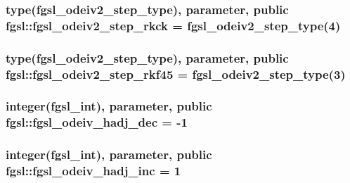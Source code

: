 \hypertarget{classfgsl_a18b4edbca94c0c9d60fbadc94d1d4964}{
\subsubsection[{fgsl\-\_\-odeiv2\-\_\-step\-\_\-rkck}]{\setlength{\rightskip}{0pt plus 5cm}type({\bf fgsl\-\_\-odeiv2\-\_\-step\-\_\-type}), parameter, public fgsl\-::fgsl\-\_\-odeiv2\-\_\-step\-\_\-rkck = {\bf fgsl\-\_\-odeiv2\-\_\-step\-\_\-type}(4)}}\label{classfgsl_a18b4edbca94c0c9d60fbadc94d1d4964}
\hypertarget{classfgsl_a9ddf77505b3bd58dea1832c7d57cb566}{
\subsubsection[{fgsl\-\_\-odeiv2\-\_\-step\-\_\-rkf45}]{\setlength{\rightskip}{0pt plus 5cm}type({\bf fgsl\-\_\-odeiv2\-\_\-step\-\_\-type}), parameter, public fgsl\-::fgsl\-\_\-odeiv2\-\_\-step\-\_\-rkf45 = {\bf fgsl\-\_\-odeiv2\-\_\-step\-\_\-type}(3)}}\label{classfgsl_a9ddf77505b3bd58dea1832c7d57cb566}
\hypertarget{classfgsl_a2325b2b4a96fc162d6be916e21d71bb0}{
\subsubsection[{fgsl\-\_\-odeiv\-\_\-hadj\-\_\-dec}]{\setlength{\rightskip}{0pt plus 5cm}integer({\bf fgsl\-\_\-int}), parameter, public fgsl\-::fgsl\-\_\-odeiv\-\_\-hadj\-\_\-dec = -\/1}}\label{classfgsl_a2325b2b4a96fc162d6be916e21d71bb0}
\hypertarget{classfgsl_a6af547b616e922df4bf6658c0199307d}{
\subsubsection[{fgsl\-\_\-odeiv\-\_\-hadj\-\_\-inc}]{\setlength{\rightskip}{0pt plus 5cm}integer({\bf fgsl\-\_\-int}), parameter, public fgsl\-::fgsl\-\_\-odeiv\-\_\-hadj\-\_\-inc = 1}}\label{classfgsl_a6af547b616e922df4bf6658c0199307d}

